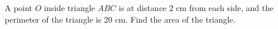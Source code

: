 A point $O$ inside triangle $ABC$ is at distance $2$ cm from each side, and the perimeter of the triangle is $20$ cm. Find the area of the triangle.
